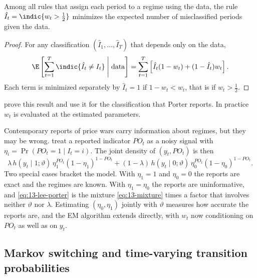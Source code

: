 \begin{proposition}\label{prop:13-classify}
Among all rules that assign each period to a regime using the data, the rule $\hat I_t = \indic\{w_t > \frac{1}{2}\}$
minimizes the expected number of misclassified periods given the data.
\end{proposition}

\begin{proof}
For any classification $(\hat I_1, \dots, \hat I_T)$ that depends only on the data,
\begin{equation*}
  \E\left[\sum_{t=1}^T \indic\{\hat I_t \ne I_t\} \;\middle|\; \text{data}\right]
  = \sum_{t=1}^T \left[\hat I_t (1 - w_t) + (1 - \hat I_t) w_t\right].
\end{equation*}
Each term is minimized separately by $\hat I_t = 1$ if $1 - w_t < w_t$, that is if $w_t > \frac{1}{2}$.
\end{proof}

 prove this result and use it for the classification that Porter reports. In practice $w_t$ is
evaluated at the estimated parameters.

Contemporary reports of price wars carry information about regimes, but they may be wrong.
\citet{LeePorter1984} treat a reported indicator $PO_t$ as a noisy signal with
$\eta_i = \Pr(PO_t = 1 \mid I_t = i)$. The joint density of $(y_t, PO_t)$ is then
\begin{equation}\label{eq:13-lee-porter}
  \lambda\, h(y_t\mid 1;\vartheta)\,\eta_1^{PO_t}(1-\eta_1)^{1-PO_t}
  + (1-\lambda)\, h(y_t\mid 0;\vartheta)\,\eta_0^{PO_t}(1-\eta_0)^{1-PO_t}.
\end{equation}
Two special cases bracket the model. With $\eta_1 = 1$ and $\eta_0 = 0$ the reports are exact and the regimes are
known. With $\eta_1 = \eta_0$ the reports are uninformative, and \eqref{eq:13-lee-porter} is the mixture
\eqref{eq:13-mixture} times a factor that involves neither $\vartheta$ nor $\lambda$. Estimating $(\eta_0, \eta_1)$ jointly with $\vartheta$ measures how accurate the reports are,
and the EM algorithm extends directly, with $w_t$ now conditioning on $PO_t$ as well as on $y_t$.

\subsection{Markov switching and time-varying transition probabilities}\label{sec:13-markov}

